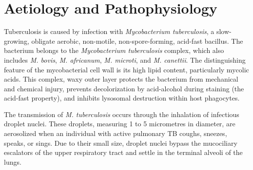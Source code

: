 \section*{Aetiology and Pathophysiology}
Tuberculosis is caused by infection with \textit{Mycobacterium tuberculosis}, a slow-growing, obligate aerobic, non-motile, non-spore-forming, acid-fast bacillus. The bacterium belongs to the \textit{Mycobacterium tuberculosis} complex, which also includes \textit{M. bovis}, \textit{M. africanum}, \textit{M. microti}, and \textit{M. canettii}. The distinguishing feature of the mycobacterial cell wall is its high lipid content, particularly mycolic acids. This complex, waxy outer layer protects the bacterium from mechanical and chemical injury, prevents decolorization by acid-alcohol during staining (the acid-fast property), and inhibits lysosomal destruction within host phagocytes.

The transmission of \textit{M. tuberculosis} occurs through the inhalation of infectious droplet nuclei. These droplets, measuring 1 to 5 micrometres in diameter, are aerosolized when an individual with active pulmonary TB coughs, sneezes, speaks, or sings. Due to their small size, droplet nuclei bypass the mucociliary escalators of the upper respiratory tract and settle in the terminal alveoli of the lungs.

